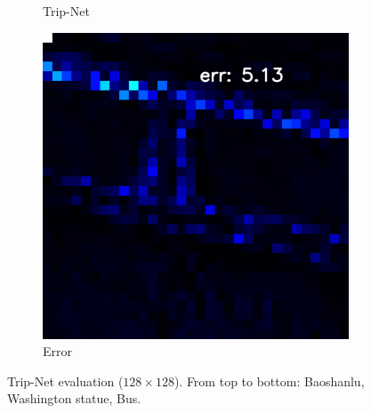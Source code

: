 \begin{figure}
\begin{subfigure}[b]{0.19\linewidth}
		\caption{Trip-Net}
	\end{subfigure}
	\begin{subfigure}[b]{0.19\linewidth}
		\includegraphics[width=\linewidth]{./Figures/gcnn_synthetic/eval_9_error_an2-8-1000.png}
		\caption{Error}
	\end{subfigure}
	
	
	
	
	\decoRule
	\caption{Trip-Net evaluation ($ 128\times 128 $). From top to bottom: Baoshanlu, Washington statue, Bus.}
	\label{fig:trip-net-eval-more}
\end{figure}
